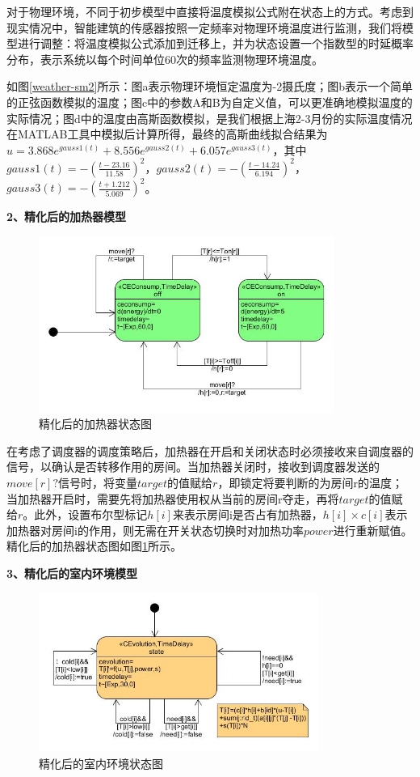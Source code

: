 	对于物理环境，不同于初步模型中直接将温度模拟公式附在状态上的方式。考虑到现实情况中，智能建筑的传感器按照一定频率对物理环境温度进行监测，我们将模型进行调整：将温度模拟公式添加到迁移上，并为状态设置一个指数型的时延概率分布，表示系统以每个时间单位60次的频率监测物理环境温度。
	
	如图\ref{weather-sm2}所示：图a表示物理环境恒定温度为-2摄氏度；图b表示一个简单的正弦函数模拟的温度；图c中的参数A和B为自定义值，可以更准确地模拟温度的实际情况；图d中的温度由高斯函数模拟，是我们根据上海2-3月份的实际温度情况在MATLAB工具中模拟后计算所得，最终的高斯曲线拟合结果为$u = 3.868e^{gauss1(t)} + 8.556e^{gauss2(t)} + 6.057e^{gauss3(t)}$，其中$gauss1(t) = -(\frac{t-23.16}{11.58})^2$，$gauss2(t) = - (\frac{t-14.24}{6.194})^2$，$gauss3(t) = -(\frac{t+1.212}{5.069})^2$。

\textbf{2、精化后的加热器模型}

	\begin{figure}[!t]
	\centering
	\includegraphics[width=3.8in]{heater-sm2.jpg}
	\caption{精化后的加热器状态图}
	\label{heater-sm2}
	\end{figure}
	
	在考虑了调度器的调度策略后，加热器在开启和关闭状态时必须接收来自调度器的信号，以确认是否转移作用的房间。当加热器关闭时，接收到调度器发送的$move[r]?$信号时，将变量$target$的值赋给$r$，即锁定将要判断的为房间r的温度；当加热器开启时，需要先将加热器使用权从当前的房间r夺走，再将$target$的值赋给$r$。此外，设置布尔型标记$h[i]$来表示房间i是否占有加热器，$h[i] \times c[i]$表示加热器对房间i的作用，则无需在开关状态切换时对加热功率$power$进行重新赋值。精化后的加热器状态图如图\ref{heater-sm2}所示。
	
\textbf{3、精化后的室内环境模型}

	\begin{figure}[!t]
	\centering
	\includegraphics[width=3.6in]{room-sm2.jpg}
	\caption{精化后的室内环境状态图}
	\label{room-sm2}
	\end{figure}
	
